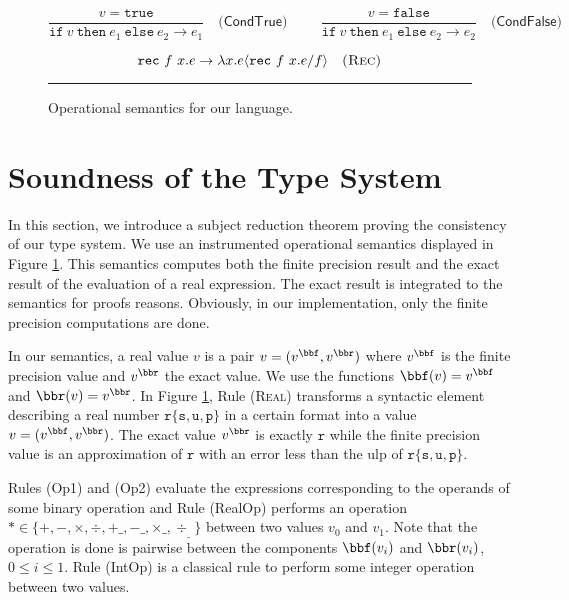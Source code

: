\begin{figure}[tb]
$$
\frac{v=\mathtt{true}}
     {\mathtt{if}\ v\ \mathtt{then}\ e_1\ \mathtt{else}\ e_2
      \rightarrow  e_1
     }\quad\textsf{(CondTrue)}
\hspace{1cm}
\frac{v=\mathtt{false}}
     {\mathtt{if}\ v\ \mathtt{then}\ e_1\ \mathtt{else}\ e_2
      \rightarrow  e_2
     }\quad\textsf{(CondFalse)}
$$

$$
     {\mathtt{rec}\ f\ x.e} \rightarrow \lambda x.e\langle \mathtt{rec}\ f\ x.e/f\rangle \quad\textsc{(Rec)}
$$

\vspace{0.1cm}
\hrule
\caption{\label{figsem}Operational semantics for our language.} 
\end{figure}


\section{Soundness of the Type System}
\label{correct}

In this section, we introduce a subject reduction theorem proving the consistency of our type system.
We use an instrumented operational semantics displayed in Figure \ref{figsem}.
This semantics computes both the finite 
precision result  and the exact result of the evaluation of a real expression. The exact result
is integrated to the semantics for proofs reasons. Obviously, in our implementation, only
the finite precision computations are done.

In our semantics, a real value $v$ is a pair $v=(v^\bbf,v^\bbr)$ where $v^\bbf$ is the finite precision value
and $v^\bbr$ the exact value. We use the functions   $\bbf(v)=v^\bbf$ and $\bbr(v)=v^\bbr$.
In Figure \ref{figsem}, Rule \textsc{(Real)} transforms a syntactic element describing a real number
$\mathtt{r\{s,u,p\} }$ in a certain format into a value $v=(v^\bbf,v^\bbr)$. The exact value $v^\bbr$ is 
exactly $\mathtt{r}$ while the finite precision value is an approximation of $\mathtt{r}$ with
an error less than the \textsf{ulp} of $\mathtt{r\{s,u,p\} }$.

Rules \textsf{(Op1)} and  \textsf{(Op2)} evaluate the expressions corresponding to the operands
of some binary operation and Rule  \textsf{(RealOp)} performs an operation $\ast\in\{+,-,\times,\div,+\_,-\_,\times\_,\div_\_\}$
between two values $v_0$ and $v_1$. Note that the operation is done is pairwise between the components
$\bbf(v_i)$ and $\bbr(v_i)$, $0\le i\le 1$. Rule \textsf{(IntOp)} is a classical rule to perform some integer operation
between two values. 


